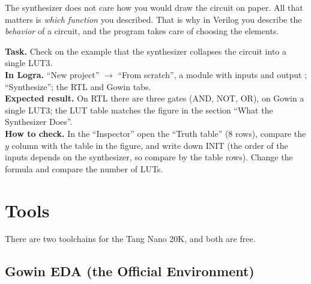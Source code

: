 \begin{ideabox}
The synthesizer does not care how you would draw the circuit on paper. All that matters is
\emph{which function} you described. That is why in Verilog you describe the
\emph{behavior} of a circuit, and the program takes care of choosing the elements.
\end{ideabox}

\begin{diybox}
\textbf{Task.} Check on the example  that the synthesizer collapses the circuit into a single LUT3.\\
\textbf{In Logra.} ``New project'' $\to$ ``From scratch'', a  module with inputs  and output ; ``Synthesize''; the RTL and Gowin tabs.\\
\textbf{Expected result.} On RTL there are three gates (AND, NOT, OR), on Gowin a single LUT3; the LUT table matches the figure in the section ``What the Synthesizer Does''.\\
\textbf{How to check.} In the ``Inspector'' open the ``Truth table'' (8 rows), compare the $y$ column with the table in the figure, and write down INIT (the order of the inputs depends on the synthesizer, so compare by the table rows).  Change the formula and compare the number of LUTs.
\end{diybox}

\section{Tools}

There are two toolchains for the Tang Nano 20K, and both are free.

\subsection{Gowin EDA (the Official Environment)}

